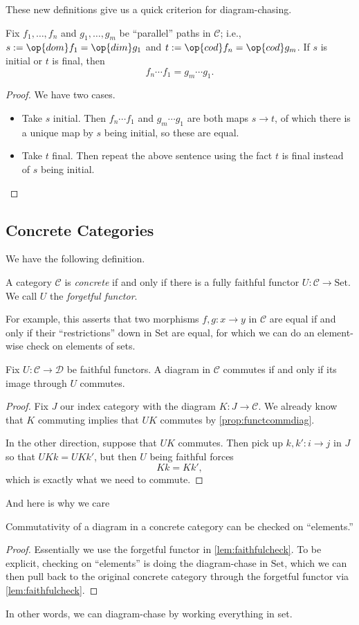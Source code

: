 These new definitions give us a quick criterion for diagram-chasing.
\begin{lemma}
	Fix $f_1,\ldots,f_n$ and $g_1,\ldots,g_m$ be ``parallel'' paths in $\mathcal C$; i.e., $s:=\op{dom}f_1=\op{dim}g_1$ and $t:=\op{cod}f_n=\op{cod}g_m$. If $s$ is initial or $t$ is final, then
	\[f_n\cdots f_1=g_m\cdots g_1.\]
\end{lemma}
\begin{proof}
	We have two cases.
	\begin{itemize}
		\item Take $s$ initial. Then $f_n\cdots f_1$ and $g_m\cdots g_1$ are both maps $s\to t$, of which there is a unique map by $s$ being initial, so these are equal.
		\item Take $t$ final. Then repeat the above sentence using the fact $t$ is final instead of $s$ being initial.
		\qedhere
	\end{itemize}
\end{proof}

\subsection{Concrete Categories}
We have the following definition.
\begin{definition}[Concrete]
	A category $\mathcal C$ is \textit{concrete} if and only if there is a fully faithful functor $U:\mathcal C\to\mathrm{Set}$. We call $U$ the \textit{forgetful functor}.
\end{definition}
For example, this asserts that two morphisms $f,g:x\to y$ in $\mathcal C$ are equal if and only if their ``restrictions'' down in $\mathrm{Set}$ are equal, for which we can do an element-wise check on elements of sets.
\begin{lemma} \label{lem:faithfulcheck}
	Fix $U:\mathcal C\to\mathcal D$ be faithful functors. A diagram in $\mathcal C$ commutes if and only if its image through $U$ commutes.
\end{lemma}
\begin{proof}
	Fix $J$ our index category with the diagram $K:J\to\mathcal C$. We already know that $K$ commuting implies that $UK$ commutes by \autoref{prop:functcommdiag}.

	In the other direction, suppose that $UK$ commutes. Then pick up $k,k':i\to j$ in $J$ so that $UKk=UKk'$, but then $U$ being faithful forces
	\[Kk=Kk',\]
	which is exactly what we need to commute.
\end{proof}
And here is why we care
\begin{corollary}
	Commutativity of a diagram in a concrete category can be checked on ``elements.''
\end{corollary}
\begin{proof}
	Essentially we use the forgetful functor in \autoref{lem:faithfulcheck}. To be explicit, checking on ``elements'' is doing the diagram-chase in $\mathrm{Set}$, which we can then pull back to the original concrete category through the forgetful functor via \autoref{lem:faithfulcheck}.
\end{proof}
In other words, we can diagram-chase by working everything in set.

